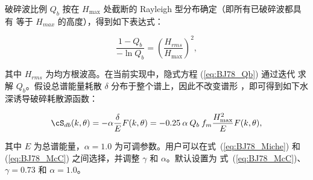 破碎波比例 $Q_b$ 按在 $H_{\max}$ 处截断的 Rayleigh 型分布确定（即所有已破碎波都具有
等于 $H_{max}$ 的高度），得到如下表达式：


\begin{equation}
\frac{1 - Q_b}{-\ln Q_b} = \left ( \frac{H_{rms}}{H_{\max}} \right ) ^{2}
 , \label{eq:BJ78_Qb}
\end{equation}

\noindent
其中 $H_{rms}$ 为均方根波高。在当前实现中，隐式方程 (\ref{eq:BJ78_Qb}) 通过迭代
求解 $Q_b$。假设总谱能量耗散 $\delta$ 分布于整个谱上，因此不改变谱形
\citep{art:EB96}，即可得到如下水深诱导破碎耗散源函数：


\begin{equation}
\cS_{db} (k,\theta) = - \alpha \frac{\delta}{E} F(k,\theta)
       = - 0.25 \: \alpha \: Q_b \: f_m \frac{H_{\max}^2}{E} F(k,\theta)
 , \label{eq:BJ78}
\end{equation}

\noindent
其中 $E$ 为总谱能量，$\alpha = 1.0$ 为可调参数。用户可以在式~(\ref{eq:BJ78_Miche})
和 (\ref{eq:BJ78_McC}) 之间选择，并调整 $\gamma$ 和 $\alpha$。默认设置为
式~(\ref{eq:BJ78_McC})、$\gamma = 0.73$ 和 $\alpha = 1.0$。
